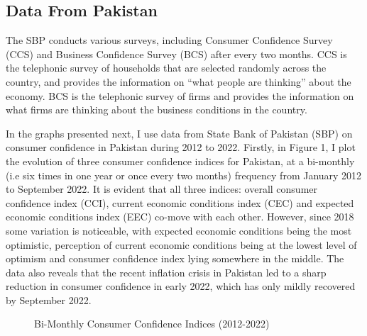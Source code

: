 \documentclass[12pt]{article}
\newcommand{\1}{\mathbbm 1}
\begin{document}
		 
		 \subsection{Data From Pakistan}
		
		
	
		
		
		The SBP conducts various surveys, including Consumer Confidence Survey (CCS) and Business Confidence Survey (BCS) after every two months. CCS is the telephonic survey of households that are selected randomly across the country, and provides the information on ``what people are thinking'' about the economy.  BCS is the telephonic survey of firms and provides the information on what firms are thinking about the business conditions in the country. 
		
		
		In the graphs presented next, I use data from State Bank of Pakistan (SBP) on consumer confidence in Pakistan during 2012 to 2022.  Firstly, in Figure 1, I plot the evolution of three consumer confidence indices for Pakistan, at a bi-monthly (i.e six times in one year or once every two months) frequency from January 2012 to September 2022. It is evident that all three indices: overall consumer confidence index (CCI), current economic conditions index (CEC) and expected economic conditions index (EEC) co-move with each other. However, since 2018 some variation is noticeable, with expected economic conditions being the most optimistic, perception of current economic conditions being at the lowest level of optimism and consumer confidence index lying somewhere in the middle. The data also reveals that the recent inflation crisis in Pakistan led to a sharp reduction in consumer confidence in early 2022, which has only mildly recovered by September 2022.
	
		
		\begin{figure}[H]
			\centering
			\scalebox{0.8}{}
			\caption[]{Bi-Monthly Consumer Confidence Indices (2012-2022)}
		\end{figure}
	
		
	
\end{document}
